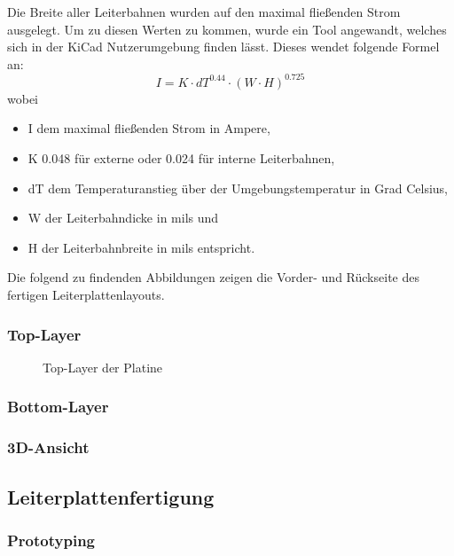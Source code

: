 Die Breite aller Leiterbahnen wurden auf den maximal fließenden Strom ausgelegt.
Um zu diesen Werten zu kommen, wurde ein Tool angewandt, welches sich in der KiCad Nutzerumgebung finden lässt.
Dieses wendet folgende Formel an: \\

\begin{equation}
    I = K \cdot dT^{0.44} \cdot (W \cdot H)^{0.725}
\end{equation}
wobei
\begin{itemize}
    \item I dem maximal fließenden Strom in Ampere,
    \item K 0.048 für externe oder 0.024 für interne Leiterbahnen,
    \item dT dem Temperaturanstieg über der Umgebungstemperatur in Grad Celsius,
    \item W der Leiterbahndicke in mils und
    \item H der Leiterbahnbreite in mils entspricht.
\end{itemize}

Die folgend zu findenden Abbildungen zeigen die Vorder- und Rückseite des fertigen Leiterplattenlayouts.
\newpage
\subsubsection{Top-Layer}
\begin{figure}[htb]
    \centering
    
    \caption{Top-Layer der Platine}
\end{figure}

\subsubsection{Bottom-Layer}

\subsubsection{3D-Ansicht}

\subsection{Leiterplattenfertigung}

\subsubsection{Prototyping}

